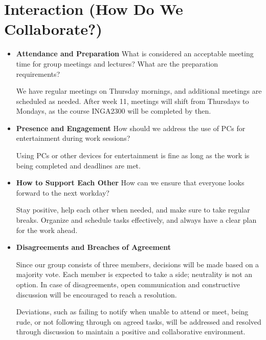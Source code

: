 \section*{Interaction (How Do We Collaborate?)}
\begin{itemize}
    \setlength{\itemsep}{10pt}
    \item \textbf{Attendance and Preparation}  
    What is considered an acceptable meeting time for group meetings and lectures? What are the preparation requirements?

    We have regular meetings on Thursday mornings, and additional meetings are scheduled as needed. After week 11, meetings will shift from Thursdays to Mondays, as the course INGA2300 will be completed by then.

    \item \textbf{Presence and Engagement}  
    How should we address the use of PCs for entertainment during work sessions?

    Using PCs or other devices for entertainment is fine as long as the work is being completed and deadlines are met.

    \item \textbf{How to Support Each Other}  
    How can we ensure that everyone looks forward to the next workday?

    Stay positive, help each other when needed, and make sure to take regular breaks. Organize and schedule tasks effectively, and always have a clear plan for the work ahead.

    \item \textbf{Disagreements and Breaches of Agreement}  


    Since our group consists of three members, decisions will be made based on a majority vote. Each member is expected to take a side; neutrality is not an option. In case of disagreements, open communication and constructive discussion will be encouraged to reach a resolution. 

    Deviations, such as failing to notify when unable to attend or meet, being rude, or not following through on agreed tasks, will be addressed and resolved through discussion to maintain a positive and collaborative environment.
    
\end{itemize}
